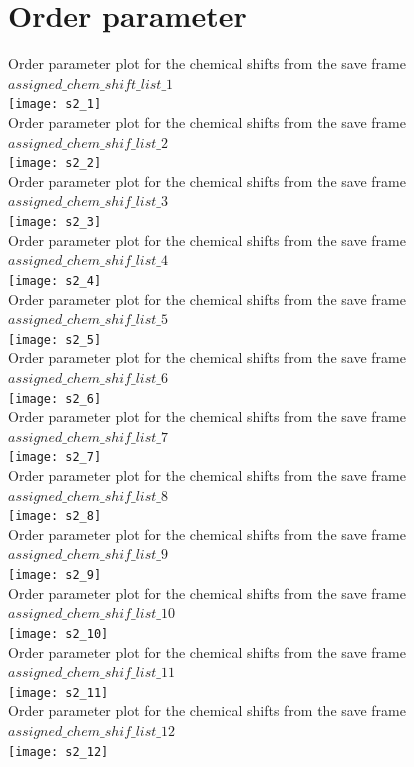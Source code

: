 \section{Order parameter}
Order parameter plot for the chemical shifts from the  save frame $assigned\_chem\_shift\_list\_1$\\ \texttt{[image: s2\_1]}\\
Order parameter plot for the chemical shifts from the  save frame $assigned\_chem\_shif\_list\_2$\\ \texttt{[image: s2\_2]}\\
Order parameter plot for the chemical shifts from the  save frame $assigned\_chem\_shif\_list\_3$\\ \texttt{[image: s2\_3]}\\
Order parameter plot for the chemical shifts from the  save frame $assigned\_chem\_shif\_list\_4$\\ \texttt{[image: s2\_4]}\\
Order parameter plot for the chemical shifts from the  save frame $assigned\_chem\_shif\_list\_5$\\ \texttt{[image: s2\_5]}\\
Order parameter plot for the chemical shifts from the  save frame $assigned\_chem\_shif\_list\_6$\\ \texttt{[image: s2\_6]}\\
Order parameter plot for the chemical shifts from the  save frame $assigned\_chem\_shif\_list\_7$\\ \texttt{[image: s2\_7]}\\
Order parameter plot for the chemical shifts from the  save frame $assigned\_chem\_shif\_list\_8$\\ \texttt{[image: s2\_8]}\\
Order parameter plot for the chemical shifts from the  save frame $assigned\_chem\_shif\_list\_9$\\ \texttt{[image: s2\_9]}\\
Order parameter plot for the chemical shifts from the  save frame $assigned\_chem\_shif\_list\_10$\\ \texttt{[image: s2\_10]}\\
Order parameter plot for the chemical shifts from the  save frame $assigned\_chem\_shif\_list\_11$\\ \texttt{[image: s2\_11]}\\
Order parameter plot for the chemical shifts from the  save frame $assigned\_chem\_shif\_list\_12$\\ \texttt{[image: s2\_12]}\\
